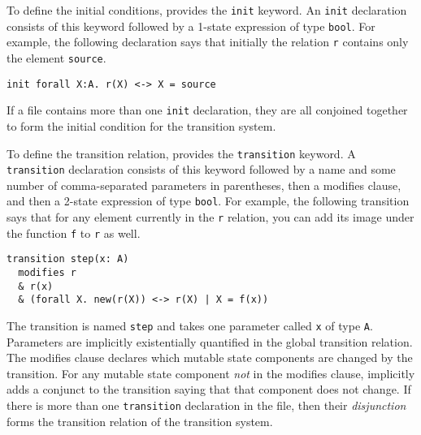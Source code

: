 To define the initial conditions,
  \mypyvy provides the \lstinline[language=mypyvy]{init} keyword.
An \lstinline[language=mypyvy]{init} declaration consists of this keyword
  followed by a 1-state expression of type \lstinline[language=mypyvy]{bool}.
For example, the following declaration says that initially
  the relation \lstinline[language=mypyvy]{r} contains only the element \lstinline[language=mypyvy]{source}.
\begin{lstlisting}[language=mypyvy, xleftmargin=.2\textwidth, xrightmargin=.2\textwidth]
  init forall X:A. r(X) <-> X = source
\end{lstlisting}
If a file contains more than one \lstinline[language=mypyvy]{init} declaration,
  they are all conjoined together to form the initial condition for the transition system.

To define the transition relation,
  \mypyvy provides the \lstinline[language=mypyvy]{transition} keyword.
A \lstinline[language=mypyvy]{transition} declaration consists of this keyword
  followed by a name and some number of comma-separated parameters in parentheses,
  then a modifies clause,
  and then a 2-state expression of type \lstinline[language=mypyvy]{bool}.
For example, the following transition says that for any element
  currently in the \lstinline[language=mypyvy]{r} relation,
  you can add its image under the function \lstinline[language=mypyvy]{f}
  to \lstinline[language=mypyvy]{r} as well.
\begin{lstlisting}[language=mypyvy, xleftmargin=.2\textwidth, xrightmargin=.2\textwidth]
transition step(x: A)
  modifies r
  & r(x)
  & (forall X. new(r(X)) <-> r(X) | X = f(x))
\end{lstlisting}
The transition is named \lstinline[language=mypyvy]{step} and takes one parameter
  called \lstinline[language=mypyvy]{x} of type \lstinline[language=mypyvy]{A}.
Parameters are implicitly existentially quantified in the global transition relation.
The modifies clause declares which mutable state components are changed by the transition.
For any mutable state component \emph{not} in the modifies clause,
  \mypyvy implicitly adds a conjunct to the transition saying that
  that component does not change.
If there is more than one \lstinline[language=mypyvy]{transition} declaration in the file,
  then their \emph{disjunction} forms the transition relation of the transition system.


